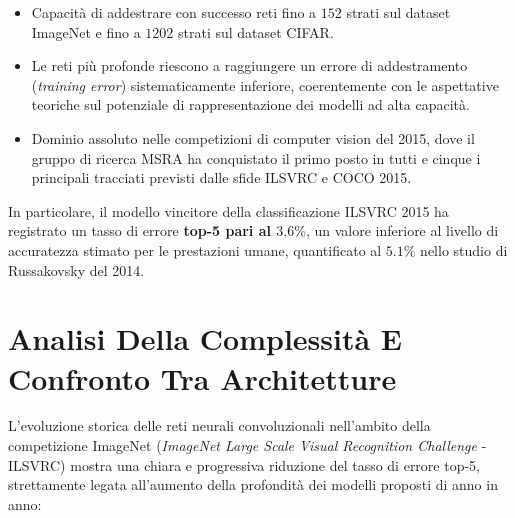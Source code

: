 ﻿\documentclass[11pt, a4paper]{article}
\begin{document}
\begin{itemize}
    \item Capacità di addestrare con successo reti fino a $152$ strati sul dataset ImageNet e fino a $1202$ strati sul dataset CIFAR.
    \item Le reti più profonde riescono a raggiungere un errore di addestramento (\emph{training error}) sistematicamente inferiore, coerentemente con le aspettative teoriche sul potenziale di rappresentazione dei modelli ad alta capacità.
    \item Dominio assoluto nelle competizioni di computer vision del 2015, dove il gruppo di ricerca MSRA ha conquistato il primo posto in tutti e cinque i principali tracciati previsti dalle sfide ILSVRC e COCO 2015.
\end{itemize}


In particolare, il modello vincitore della classificazione ILSVRC 2015 ha registrato un tasso di errore \textbf{top-5 pari al $3.6\%$}, un valore inferiore al livello di accuratezza stimato per le prestazioni umane, quantificato al $5.1\%$ nello studio di Russakovsky del 2014.


\newpage

\section{Analisi Della Complessità E Confronto Tra Architetture}

L'evoluzione storica delle reti neurali convoluzionali nell'ambito della competizione ImageNet (\emph{ImageNet Large Scale Visual Recognition Challenge} - ILSVRC) mostra una chiara e progressiva riduzione del tasso di errore top-5, strettamente legata all'aumento della profondità dei modelli proposti di anno in anno:
\end{document}
